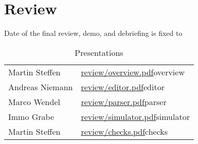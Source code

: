 
\section*{Review}

Date of the final review, demo, and debriefing is fixed to

\begin{center}
\end{center}



\begin{table}[htbp]
  \centering
  \begin{tabular}{ll}
    Martin Steffen & \url{review/overview.pdf}{overview}
    \\
    Andreas Niemann & \url{review/editor.pdf}{editor}
    \\
    Marco Wendel & \url{review/parser.pdf}{parser}
    \\
    Immo Grabe & \url{review/simulator.pdf}{simulator}
    \\
    Martin Steffen & \url{review/checks.pdf}{checks}
  \end{tabular}
  \caption{Presentations}
  \label{tab:presentations}
\end{table}



